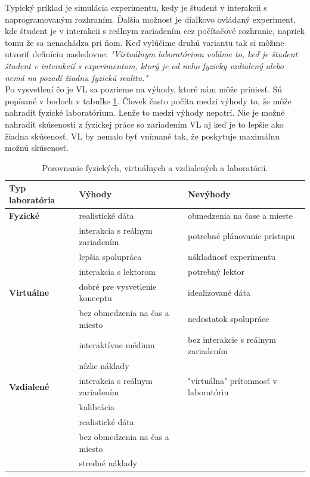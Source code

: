 Typický príklad je simulácia experimentu, kedy je študent v interakcii s naprogramovaným rozhraním. Ďalšia možnosť je diaľkovo ovládaný experiment, kde študent je v interakcii s reálnym zariadením cez počítačové rozhranie, napriek tomu že sa nenachádza pri ňom. 
Keď vylúčime druhú variantu tak si môžme utvoriť definíciu nasledovne: \textit{"Virtuálnym laboratóriom voláme to, keď je študent študent v interakcií s experimentom, ktorý je od neho fyzicky vzdialený alebo nemá na pozadí žiadnu fyzickú realitu."}\cite{hatherly}\\

Po vysvetlení čo je VL sa pozrieme na výhody, ktoré nám môže priniesť. Sú popísané v bodoch v tabuľke \ref{table-real-remote-virtual-laboratory}.
Človek často počíta medzi výhody to, že môže nahradiť fyzické laboratórium. Lenže to medzi výhody nepatrí. Nie je možné nahradiť skúsenosti z fyzickej práce so zariadením VL aj keď je to lepšie ako žiadna skúsenosť. VL by nemalo byť vnímané tak, že poskytuje maximálnu možnú skúsenosť.\\

\begin{table}[H]
\small
\begin{tabular}{l l l}
\hline
\textbf{Typ laboratória} & \textbf{Výhody}  & \textbf{Nevýhody} \\ \hline
\textbf{Fyzické} & realistické dáta & obmedzenia na čase a mieste \\
& interakcia s reálnym zariadením & potrebné plánovanie prístupu\\
& lepšia spolupráca & nákladnosť experimentu \\
& interakcia s lektorom & potrebný lektor \\ \hline
\textbf{Virtuálne} & dobré pre vysvetlenie konceptu &  idealizované dáta\\
& bez obmedzenia na čas a miesto &  nedostatok spolupráce  \\
& interaktívne médium & bez interakcie s reálnym zariadením \\
& nízke náklady & \\ \hline
\textbf{Vzdialené} & interakcia s reálnym zariadením &  "virtuálna" prítomnosť v laboratóriu \\
& kalibrácia & \\
& realistické dáta & \\
& bez obmedzenia na čas a miesto & \\
& stredné náklady & \\ \hline
\end{tabular}
\caption{Porovnanie fyzických, virtuálnych a vzdialených a laboratórií.}
\label{table-real-remote-virtual-laboratory}
\end{table}

